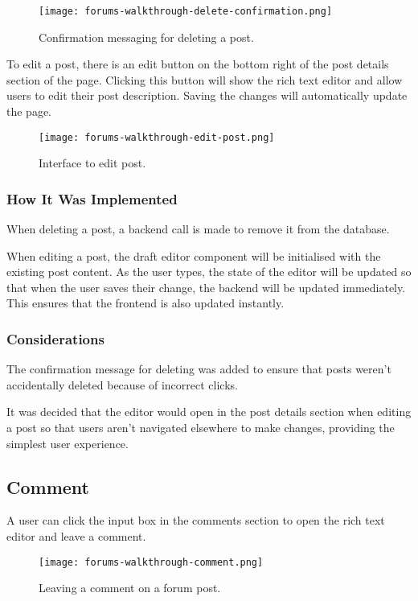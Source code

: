 \begin{figure}[h!]
    \texttt{[image: forums-walkthrough-delete-confirmation.png]}
    \centering
    \caption{Confirmation messaging for deleting a post.}
\end{figure}

To edit a post, there is an edit button on the bottom right of the post details section of the page.
Clicking this button will show the rich text editor and allow users to edit their post description.
Saving the changes will automatically update the page.

\begin{figure}[h!]
    \texttt{[image: forums-walkthrough-edit-post.png]}
    \centering
    \caption{Interface to edit post.}
\end{figure}

\subsubsection{How It Was Implemented}
When deleting a post, a backend call is made to remove it from the database.

When editing a post, the draft editor component will be initialised with the existing post content.
As the user types, the state of the editor will be updated so that when the user saves their change, the backend will be updated immediately.
This ensures that the frontend is also updated instantly.

\subsubsection{Considerations}
The confirmation message for deleting was added to ensure that posts weren't accidentally deleted because of incorrect clicks.

It was decided that the editor would open in the post details section when editing a post so that users aren't navigated elsewhere to make changes, providing the simplest user experience.

\subsection{Comment}
A user can click the input box in the comments section to open the rich text editor and leave a comment.

\newpage

\begin{figure}[h!]
    \texttt{[image: forums-walkthrough-comment.png]}
    \centering
    \caption{Leaving a comment on a forum post.}
\end{figure}

